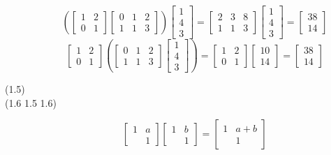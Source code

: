 \begin{description}
{\color{cBlue}\textbullet}
$$\left( \begin{bmatrix}
1 & 2 \\
0 & 1
\end{bmatrix}\begin{bmatrix}
0 & 1 & 2 \\
1 & 1 & 3
\end{bmatrix} \right)\begin{bmatrix}
1 \\
4 \\
3
\end{bmatrix} = \begin{bmatrix}
2 & 3 & 8 \\
1 & 1 & 3
\end{bmatrix}\begin{bmatrix}
1 \\
4 \\
3
\end{bmatrix} = \begin{bmatrix}
38 \\
14
\end{bmatrix}$$
$$\begin{bmatrix}
1 & 2 \\
0 & 1
\end{bmatrix} \left(\begin{bmatrix}
0 & 1 & 2 \\
1 & 1 & 3
\end{bmatrix}\begin{bmatrix}
1 \\
4 \\
3
\end{bmatrix} \right) = \begin{bmatrix}
1 & 2 \\
0 & 1
\end{bmatrix}\begin{bmatrix}
10 \\
14
\end{bmatrix} = \begin{bmatrix}
38 \\
14
\end{bmatrix}$$


\item[(1.5)]

\item[(1.6 {\color{cBlue} 1.5 1.6})]
{\color{cBlue}\textbullet}
$$\begin{bmatrix}
1 & a \\
& 1
\end{bmatrix}\begin{bmatrix}
1 & b \\
& 1
\end{bmatrix} = \begin{bmatrix}
1 & a + b \\
& 1
\end{bmatrix}$$


\end{description}
